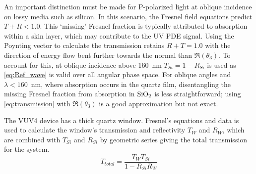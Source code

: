 
An important distinction must be made for P-polarized light at oblique incidence on lossy media such as silicon. In this scenario, the Fresnel field equations predict $T+R < 1.0$. This `missing' Fresnel fraction is typically attributed to absorption within a skin layer, which may contribute to the UV PDE signal. Using the Poynting vector to calculate the transmission retains $R + T = 1.0$ with the direction of energy flow bent further towards the normal than $\Re (\theta_3)$. To account for this, at oblique incidence above 160~nm $T_{Si} = 1-R_{Si}$ is used as \autoref{eq:Ref_wave} is valid over all angular phase space. For oblique angles and $\lambda < 160$~nm, where absorption occurs in the quartz film, disentangling the missing Fresnel fraction from absorption in $\sio$ is less straightforward; using \autoref{eq:transmission} with $\Re ({\theta_3})$ is a good approximation but not exact.

The VUV4 device has a thick quartz window. Fresnel's equations and \sio data is used to calculate the window's transmission and reflectivity $T_W$ and $R_W$, which are combined with $T_{Si}$ and $R_{Si}$ by geometric series giving the total transmission for the system.
\begin{equation}
    \label{eq:T_total}
    T_{total} = \frac{T_W T_{Si}}{1 - R_{Si}R_W}
\end{equation}

